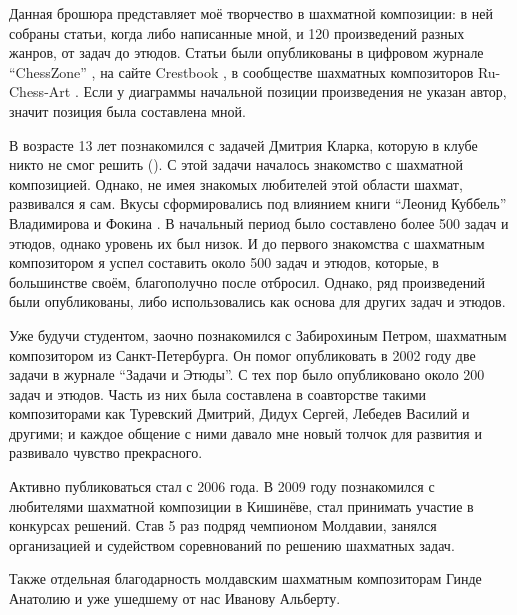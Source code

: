 Данная брошюра представляет моё творчество в шахматной композиции: в ней собраны статьи, когда либо написанные мной, и 120 произведений разных жанров, от задач до этюдов. Статьи были опубликованы в цифровом журнале ``ChessZone'' \cite{ChessZone}, на сайте Crestbook \cite{CrestBook}, в сообществе шахматных композиторов Ru-Chess-Art \cite{RuChessArt}. Если у диаграммы начальной позиции произведения не указан автор, значит позиция была составлена мной.

В возрасте 13 лет познакомился с задачей Дмитрия Кларка, которую в клубе никто не смог решить (). С этой задачи началось знакомство с шахматной композицией. Однако, не имея знакомых любителей этой области шахмат, развивался я сам. Вкусы сформировались под влиянием книги ``Леонид Куббель'' Владимирова и Фокина \cite{Kubbel}. В начальный период было составлено более 500 задач и этюдов, однако уровень их был низок. И до первого знакомства с шахматным композитором я успел составить около 500 задач и этюдов, которые, в большинстве своём, благополучно после отбросил. Однако, ряд произведений были опубликованы, либо использовались как основа для других задач и этюдов.

Уже будучи студентом, заочно познакомился с Забирохиным Петром, шахматным композитором из Санкт-Петербурга. Он помог опубликовать в 2002 году две задачи в журнале ``Задачи и Этюды''. С тех пор было опубликовано около 200 задач и этюдов. Часть из них была составлена в соавторстве такими композиторами как Туревский Дмитрий, Дидух Сергей, Лебедев Василий и другими; и каждое общение с ними давало мне новый толчок для развития и развивало чувство прекрасного.

Активно публиковаться стал с 2006 года. В 2009 году познакомился с любителями шахматной композиции в Кишинёве, стал принимать участие в конкурсах решений. Став 5 раз подряд чемпионом Молдавии, занялся организацией и судейством соревнований по решению шахматных задач. 


Также отдельная благодарность молдавским шахматным композиторам Гинде Анатолию и уже ушедшему от нас Иванову Альберту.
